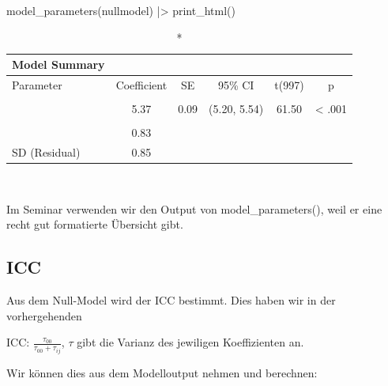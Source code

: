 \documentclass[
  letterpaper,
  DIV=11,
  numbers=noendperiod]{scrreprt}
\newenvironment{Shaded}{\begin{snugshade}}{\end{snugshade}}
\newcommand{\DecValTok}[1]{\textcolor[rgb]{0.68,0.00,0.00}{#1}}
\newcommand{\FunctionTok}[1]{\textcolor[rgb]{0.28,0.35,0.67}{#1}}
\newcommand{\NormalTok}[1]{\textcolor[rgb]{0.00,0.23,0.31}{#1}}
\newcommand{\OtherTok}[1]{\textcolor[rgb]{0.00,0.23,0.31}{#1}}
\newcommand{\SpecialCharTok}[1]{\textcolor[rgb]{0.37,0.37,0.37}{#1}}
\newcommand{\StringTok}[1]{\textcolor[rgb]{0.13,0.47,0.30}{#1}}
\begin{document}
\begin{Shaded}
\begin{Highlighting}[]
\FunctionTok{model\_parameters}\NormalTok{(nullmodel) }\SpecialCharTok{|\textgreater{}} \FunctionTok{print\_html}\NormalTok{()}
\end{Highlighting}
\end{Shaded}

\begingroup
\fontsize{12.0pt}{14.4pt}\selectfont
\setlength{\LTpost}{0mm}
\begin{longtable*}{lccccc}
\caption*{
{\large Model Summary}
} \\ 
\toprule
Parameter & Coefficient & SE & 95\% CI & t(997) & p \\ 
\midrule\addlinespace[2.5pt]
 \\[2.5pt] 
\midrule{} & 5.37 & 0.09 & (5.20, 5.54) & 61.50 & < .001 \\ 
\midrule\addlinespace[2.5pt]
 \\[2.5pt] 
\midrule{} & 0.83 &  &  &  &  \\ 
{SD (Residual)} & 0.85 &  &  &  &  \\ 
\bottomrule
\end{longtable*}
\begin{minipage}{\linewidth}
\\
\end{minipage}
\endgroup

Im Seminar verwenden wir den Output von model\_parameters(), weil er
eine recht gut formatierte Übersicht gibt.

\subsection{ICC}\label{icc}

Aus dem Null-Model wird der ICC bestimmt. Dies haben wir in der
vorhergehenden

ICC: \(\frac{\tau_{00}}{\tau_{00}+\tau_{ij}}\), \(\tau\) gibt die
Varianz des jewiligen Koeffizienten an.

Wir können dies aus dem Modelloutput nehmen und berechnen:

\begin{Shaded}
\end{Shaded}
\end{document}
